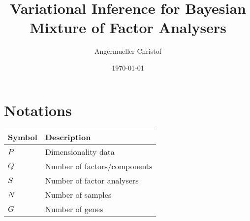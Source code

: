 \documentclass[a4paper]{article}
\author{Angermueller Christof}
\date{\today}
\title{Variational Inference for Bayesian Mixture of Factor Analysers}
\begin{document}
\maketitle

\newcommand{\bs}{\boldsymbol}
\newcommand{\Xy}{\bs{y}^{n,g}}
\newcommand{\Xx}{\bs{x}^{n,g}}
\newcommand{\Xz}{\bs{z}^{n,g}}
\newcommand{\Xp}{\bs{\pi}}
\newcommand{\Xl}{\Lambda^s}
\newcommand{\Xu}{\bs{\mu}^s}
\newcommand{\Xus}{\bs{\mu}^*}
\newcommand{\Xun}{\bs{\nu}^*}
\newcommand{\Xn}{\bs{\nu}^s}
\newcommand{\Xe}{\Psi}
\newcommand{\Xc}{\Xl{\Xl}^T}
\newcommand{\Xdiag}{\operatorname{diag}}

\section{Notations}
\begin{table}[h]
  \begin{center}
  \begin{tabular}{ll}
    \toprule
    Symbol & Description \\ \hline
    $P$ & Dimensionality data \\
    $Q$ & Number of factors/components \\
    $S$ & Number of factor analysers \\
    $N$ & Number of samples \\
    $G$ & Number of genes \\
    \bottomrule
  \end{tabular}
  \end{center}
\end{table}
\end{document}
